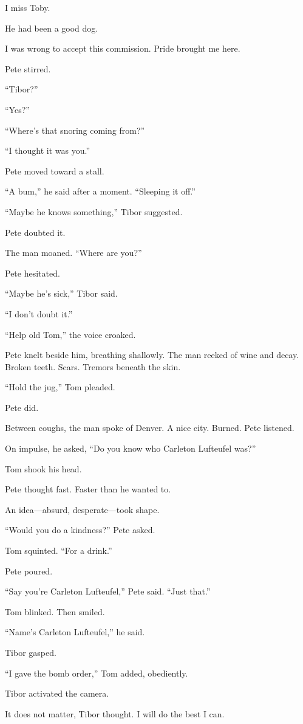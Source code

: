 I miss Toby.

He had been a good dog.

I was wrong to accept this commission. Pride brought me here.

Pete stirred.

“Tibor?”

“Yes?”

“Where’s that snoring coming from?”

“I thought it was you.”

Pete moved toward a stall.

“A bum,” he said after a moment. “Sleeping it off.”

“Maybe he knows something,” Tibor suggested.

Pete doubted it.

The man moaned. “Where are you?”

Pete hesitated.

“Maybe he’s sick,” Tibor said.

“I don’t doubt it.”

“Help old Tom,” the voice croaked.

Pete knelt beside him, breathing shallowly. The man reeked of wine and decay. Broken teeth. Scars. Tremors beneath the skin.

“Hold the jug,” Tom pleaded.

Pete did.

Between coughs, the man spoke of Denver. A nice city. Burned. Pete listened.

On impulse, he asked, “Do you know who Carleton Lufteufel was?”

Tom shook his head.

Pete thought fast. Faster than he wanted to.

An idea—absurd, desperate—took shape.

“Would you do a kindness?” Pete asked.

Tom squinted. “For a drink.”

Pete poured.

“Say you’re Carleton Lufteufel,” Pete said. “Just that.”

Tom blinked. Then smiled.

“Name’s Carleton Lufteufel,” he said.

Tibor gasped.

“I gave the bomb order,” Tom added, obediently.

Tibor activated the camera.

It does not matter, Tibor thought. I will do the best I can.

